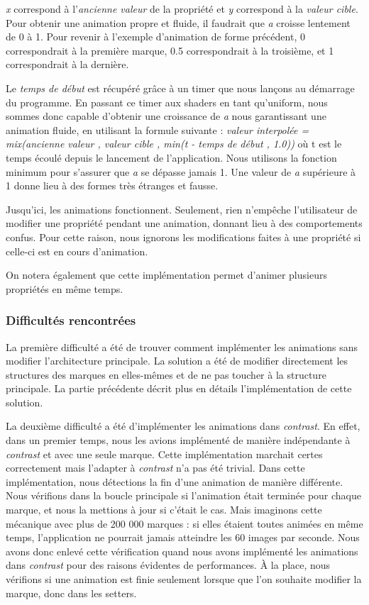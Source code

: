 \documentclass[12pt]{article}
\begin{document}
\textit{x} correspond à l'\textit{ancienne valeur} de la propriété et \textit{y} correspond à la
\textit{valeur cible}.
Pour obtenir une animation propre et fluide, il faudrait que \textit{a} croisse lentement de 0 à 1.
Pour revenir à l'exemple d'animation de forme précédent, 0 correspondrait à la première marque, 0.5
correspondrait à la troisième, et 1 correspondrait à la dernière.

Le \textit{temps de début} est récupéré grâce à un timer que nous lançons au démarrage du programme.
En passant ce timer aux shaders en tant qu'\gls{uniform}, nous sommes donc capable d'obtenir une croissance
de \textit{a} nous garantissant une animation fluide, en utilisant la formule suivante :
\textit{valeur interpolée = mix(ancienne valeur , valeur cible , min(t - temps de début , 1.0))} où t est
le temps  écoulé depuis le lancement de l'application.
Nous utilisons la fonction minimum pour s'assurer que \textit{a} se dépasse jamais 1. Une valeur de
\textit{a} supérieure à 1 donne lieu à des formes très étranges et fausse.

Jusqu'ici, les animations fonctionnent. Seulement, rien n'empêche l'utilisateur de modifier une propriété pendant une animation, donnant lieu à des comportements confus.
Pour cette raison, nous ignorons les modifications faites à une propriété si celle-ci est en cours
d'animation.

On notera également que cette implémentation permet d'animer plusieurs propriétés en même temps.

\subsubsection{Difficultés rencontrées}

La première difficulté a été de trouver comment implémenter les animations sans modifier l'architecture
principale. La solution a été de modifier directement les structures des
marques en elles-mêmes et de ne pas toucher à la structure principale. La partie précédente décrit plus en
détails l'implémentation de cette solution.

La deuxième difficulté a été d'implémenter les animations dans \textit{contrast}.
En effet, dans un premier temps, nous les avions implémenté de manière indépendante à \textit{contrast} et avec une seule marque. Cette implémentation marchait certes correctement mais l'adapter à \textit{contrast} n'a pas été trivial.
Dans cette implémentation, nous détections la fin d'une animation de manière différente. Nous vérifions
dans la boucle principale si l'animation était terminée pour chaque marque, et nous la mettions à jour si
c'était le cas.
Mais imaginons cette mécanique avec plus de 200 000 marques : si elles étaient toutes animées en même
temps, l'application ne pourrait jamais atteindre les 60 images par seconde.
Nous avons donc enlevé cette vérification quand nous avons implémenté les animations dans \textit{contrast}
pour des raisons évidentes de performances.
À la place, nous vérifions si une animation est finie seulement lorsque que l'on souhaite modifier la
marque, donc dans les setters.
\end{document}
